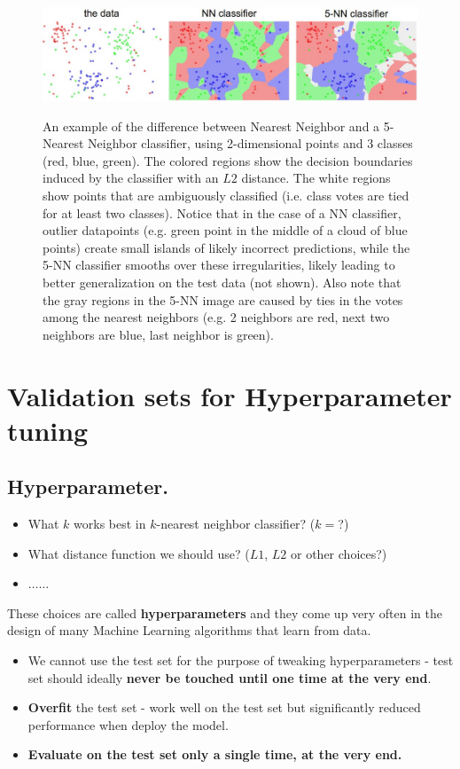 \begin{figure}[ht]
  \centering
  \includegraphics[width=5 in]{pic/knn}\\
  \caption{An example of the difference between Nearest Neighbor and a 5-Nearest Neighbor classifier, using 2-dimensional points and 3 classes (red, blue, green). The colored regions show the decision boundaries induced by the classifier with an $L2$ distance. The white regions show points that are ambiguously classified (i.e. class votes are tied for at least two classes). Notice that in the case of a NN classifier, outlier datapoints (e.g. green point in the middle of a cloud of blue points) create small islands of likely incorrect predictions, while the 5-NN classifier smooths over these irregularities, likely leading to better generalization on the test data (not shown). Also note that the gray regions in the 5-NN image are caused by ties in the votes among the nearest neighbors (e.g. 2 neighbors are red, next two neighbors are blue, last neighbor is green).}
\end{figure}

\section{Validation sets for Hyperparameter tuning}
\subsection{Hyperparameter.}
\begin{itemize}
  \item What $k$ works best in $k$-nearest neighbor classifier? ($k=$?)
  \item What distance function we should use? ($L1$, $L2$ or other choices?)
  \item $\ldots \ldots$
\end{itemize}
These choices are called \textbf{hyperparameters} and they come up very often in the design of many Machine Learning algorithms that learn from data. 

\begin{itemize}
  \item We cannot use the test set for the purpose of tweaking hyperparameters - test set should ideally \textbf{never be touched until one time at the very end}.
  \item \textbf{Overfit} the test set - work well on the test set but significantly reduced performance when deploy the model.
  \item \textbf{Evaluate on the test set only a single time, at the very end.}
\end{itemize}

